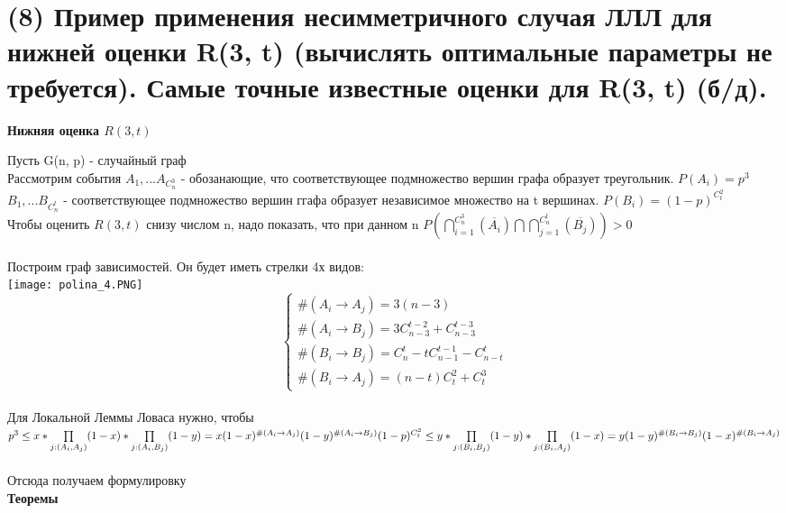 \section{(8) Пример применения несимметричного случая ЛЛЛ для нижней оценки R(3, t) (вычислять оптимальные параметры не требуется). Самые точные известные оценки для R(3, t) (б/д).}

\textbf{Нижняя оценка $R(3,t)$}

Пусть G(n, p) - случайный граф \\
Рассмотрим события $A_1, ... A_{C_n^3}$ - обозанающие, что соответствующее подмножество вершин графа образует треугольник. $P(A_i) = p^3$
\\
$B_1, ... B_{C_n^t}$ - соответствующее подмножество вершин ггафа образует независимое множество на t вершинах. $P(B_i) = (1-p)^{C_t^2}$
\\
Чтобы оценить $R(3,t)$ снизу числом n, надо показать, что при данном n $P(\bigcap\limits_{i=1}^{C_n^3}(\overline{A_i})\bigcap \bigcap\limits_{j=1}^{C_n^t}(\overline{B_j})) > 0$
\\
\\
Построим граф зависимостей. Он будет иметь стрелки 4х видов:
\\
\texttt{[image: polina\_4.PNG]}
\\
\begin{equation*}
\begin{cases}
   \#(A_i \rightarrow A_j) = 3(n-3)\\
  \#(A_i \rightarrow B_j) = 3C_{n-3}^{t-2} + C_{n-3}^{t-3} \\
  \#(B_i \rightarrow B_j) = C_n^t - tC_{n-1}^{t-1} - C_{n-t}^{t} \\
  \#(B_i \rightarrow A_j) = (n-t)C_t^2 + C_t^3
 \end{cases}
\end{equation*}
\\
Для Локальной Леммы Ловаса нужно, чтобы \\
$p^3 \leq x*\prod\limits_{j: (A_i, A_j)}(1-x)*\prod\limits_{j: (A_i, B_j)}(1-y)  =  x(1-x)^{\#(A_i \rightarrow A_j)}(1-y)^{\#(A_i \rightarrow B_j)}\\ (1-p)^{C_t^2} \leq y*\prod\limits_{j: (B_i, B_j)}(1-y)*\prod\limits_{j: (B_i, A_j)}(1-x)  =  y(1-y)^{\#(B_i\rightarrow B_j)}(1-x)^{\#(B_i \rightarrow A_j)}$
\\
\\
Отсюда получаем формулировку 
\\\textbf{Теоремы}
\\
\\
